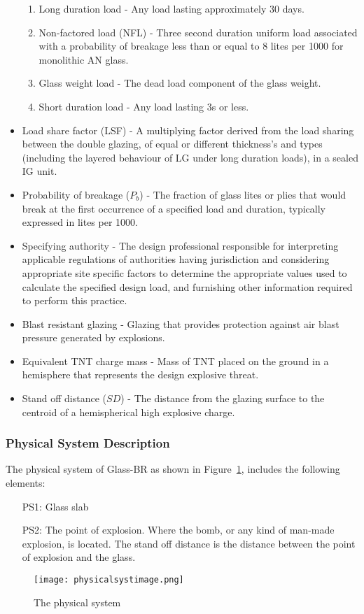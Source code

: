 \documentclass[12pt]{article}
\begin{document}
\begin{itemize}
\begin{enumerate}
\item{Long duration load - Any load lasting approximately 30 days.}
\item{Non-factored load (NFL) - Three second duration uniform load associated with a probability of breakage less than or equal to 8 lites per 1000 for monolithic AN glass.}
\item{Glass weight load - The dead load component of the glass weight.}
\item{Short duration load - Any load lasting 3s or less.}
\end{enumerate}
\item{Load share factor (LSF) - A multiplying factor derived from the load sharing between the double glazing, of equal or different thickness's and types (including the layered behaviour of LG under long duration loads), in a sealed IG unit.}
\item{Probability of breakage ($P_{b}$) - The fraction of glass lites or plies that would break at the first occurrence of a specified load and duration, typically expressed in lites per 1000.}
\item{Specifying authority - The design professional responsible for interpreting applicable regulations of authorities having jurisdiction and considering appropriate site specific factors to determine the appropriate values used to calculate the specified design load, and furnishing other information required to perform this practice.}
\item{Blast resistant glazing - Glazing that provides protection against air blast pressure generated by explosions.}
\item{Equivalent TNT charge mass - Mass of TNT placed on the ground in a hemisphere that represents the design explosive threat.}
\item{Stand off distance ($SD$) - The distance from the glazing surface to the centroid of a hemispherical high explosive charge.}
\end{itemize}
\subsubsection{Physical System Description}
\label{Sec:PSD}
The physical system of Glass-BR as shown in Figure~\ref{Figure:Tps}, includes the following elements:
\begin{itemize}
\item[PS1:]Glass slab
\item[PS2:]The point of explosion. Where the bomb, or any kind of man-made explosion, is located. The stand off distance  is the distance between the point of explosion and the glass.
\end{itemize}
\begin{figure}
\begin{center}
\texttt{[image: physicalsystimage.png]}
\caption{The physical system}
\label{Figure:Tps}
\end{center}
\end{figure}
\end{document}
